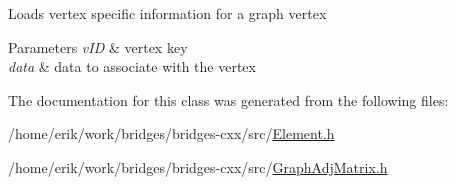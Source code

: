 Loads vertex specific information for a graph vertex


\begin{DoxyParams}{Parameters}
{\em v\+ID} & vertex key \\
\hline
{\em data} & data to associate with the vertex \\
\hline
\end{DoxyParams}


The documentation for this class was generated from the following files\+:\begin{DoxyCompactItemize}
\item 
/home/erik/work/bridges/bridges-\/cxx/src/\hyperlink{_element_8h}{Element.\+h}\item 
/home/erik/work/bridges/bridges-\/cxx/src/\hyperlink{_graph_adj_matrix_8h}{Graph\+Adj\+Matrix.\+h}\end{DoxyCompactItemize}
